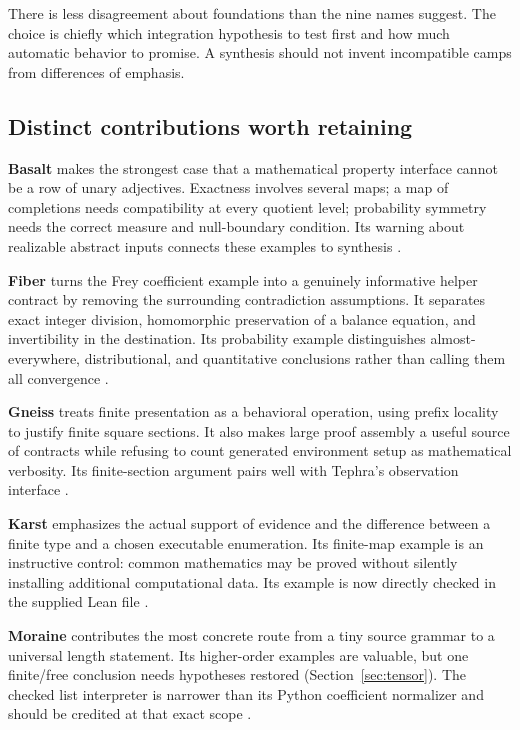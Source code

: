 \documentclass[11pt,letterpaper]{article}
\newcommand{\code}[1]{\texttt{\detokenize{#1}}}
\theoremstyle{definition}\newtheorem{definition}[proposition]{Definition}
\theoremstyle{remark}\newtheorem{remark}[proposition]{Remark}
\begin{document}
There is less disagreement about foundations than the nine names suggest.
The choice is chiefly which integration hypothesis to test first and how much
automatic behavior to promise. A synthesis should not invent incompatible camps
from differences of emphasis.

\subsection{Distinct contributions worth retaining}
\textbf{Basalt} makes the strongest case that a mathematical property interface
cannot be a row of unary adjectives. Exactness involves several maps; a map of
completions needs compatibility at every quotient level; probability symmetry
needs the correct measure and null-boundary condition. Its warning about
realizable abstract inputs connects these examples to synthesis
\cite[Sections 10--15]{basalt}.

\textbf{Fiber} turns the Frey coefficient example into a genuinely informative
helper contract by removing the surrounding contradiction assumptions. It
separates exact integer division, homomorphic preservation of a balance equation,
and invertibility in the destination. Its probability example distinguishes
almost-everywhere, distributional, and quantitative conclusions rather than
calling them all convergence \cite[Sections 9--10]{fiber}.

\textbf{Gneiss} treats finite presentation as a behavioral operation, using
prefix locality to justify finite square sections. It also makes large proof
assembly a useful source of contracts while refusing to count generated
environment setup as mathematical verbosity. Its finite-section argument pairs
well with Tephra's observation interface \cite[Sections 3, 8, 10]{gneiss}.

\textbf{Karst} emphasizes the actual support of evidence and the difference
between a finite type and a chosen executable enumeration. Its finite-map
example is an instructive control: common mathematics may be proved without
silently installing additional computational data. Its \code{List Empty}
example is now directly checked in the supplied Lean file
\cite[Sections 8, 12]{karst}.

\textbf{Moraine} contributes the most concrete route from a tiny source grammar
to a universal length statement. Its higher-order examples are valuable, but
one finite/free conclusion needs hypotheses restored
(Section~\ref{sec:tensor}). The checked list interpreter is narrower than its
Python coefficient normalizer and should be credited at that exact scope
\cite[Sections 6, 10]{moraine}.
\end{document}
